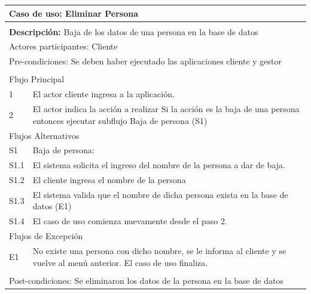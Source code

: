 \documentclass[11pt]{article}
\begin{document}
\begin{tabular}{|l|m{}|}
    \hline
    \multicolumn{2}{|m{0.9\textwidth}|}{{\bf Caso de uso: Eliminar Persona}} \\
    \hline
    \multicolumn{2}{|l|}{\rowcolor[gray]{.5}} \\
    \hline
  
    \multicolumn{2}{|p{0.9\textwidth}|}{{\bf Descripción:} Baja de los datos de una 
    persona en la base de datos } \\
  
    \hline
    \multicolumn{2}{|l|}{Actores participantes: Cliente} \\
    \hline
  
    \multicolumn{2}{|l|}{Pre-condiciones: Se deben haber ejecutado las aplicaciones cliente 
    y gestor} \\
  
    \hline
    \multicolumn{2}{|l|}{\rowcolor[gray]{.5}} \\
    \hline
    \multicolumn{2}{|l|}{Flujo Principal} \\
    \hline
    1 & El actor cliente ingresa a la aplicaci\'on. \\
    \hline
    2 &  El actor indica la acción a realizar \newline
    Si la acción es la baja de una persona entonces ejecutar subflujo Baja de persona (S1)\newline
   \\
    
    \hline
    \multicolumn{2}{|l|}{Flujos Alternativos} \\
    \hline
  
    S1 &  Baja de persona: \\ \hline
    S1.1 & El sistema solicita el ingreso del nombre de la persona a dar de baja.\\ \hline
    S1.2 & El cliente ingresa el nombre de la persona\\ \hline
    S1.3 & El sistema valida que el nombre de dicha persona exista en la base de datos (E1) \\ \hline
    S1.4 & El caso de uso comienza nuevamente desde el paso 2.\\ \hline
    
    \multicolumn{2}{|l|}{Flujos de Excepción} \\
    \hline
  
    E1 & No existe una persona con dicho nombre, se le informa al cliente y se vuelve al men\'u anterior. 
    El caso de uso finaliza.\\
  
    \hline
    \multicolumn{2}{|l|}{\rowcolor[gray]{.5}} \\
    \hline
  
   \multicolumn{2}{|m{0.9\textwidth}|}{Post-condiciones: Se eliminaron los datos de la persona en la base de datos} \\
  
    \hline
  \end{tabular}
  \newline
\end{document}
